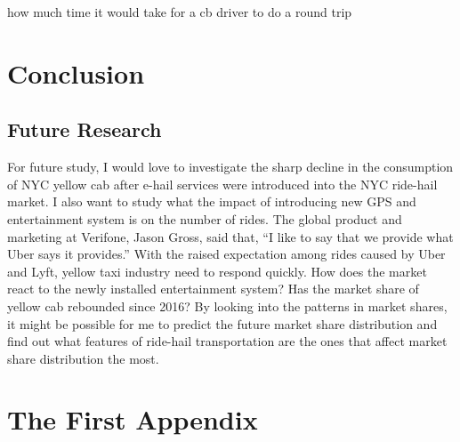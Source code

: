 \documentclass[12pt,twoside]{reedthesis}
\newenvironment{Shaded}{\begin{snugshade}}{\end{snugshade}}
\newcommand{\KeywordTok}[1]{\textcolor[rgb]{0.13,0.29,0.53}{\textbf{#1}}}
\newcommand{\DataTypeTok}[1]{\textcolor[rgb]{0.13,0.29,0.53}{#1}}
\newcommand{\DecValTok}[1]{\textcolor[rgb]{0.00,0.00,0.81}{#1}}
\newcommand{\StringTok}[1]{\textcolor[rgb]{0.31,0.60,0.02}{#1}}
\newcommand{\CommentTok}[1]{\textcolor[rgb]{0.56,0.35,0.01}{\textit{#1}}}
\newcommand{\OperatorTok}[1]{\textcolor[rgb]{0.81,0.36,0.00}{\textbf{#1}}}
\newcommand{\NormalTok}[1]{#1}
\theoremstyle{definition}
\theoremstyle{definition}
\theoremstyle{definition}
\theoremstyle{remark}
\begin{document}
\begin{Shaded}
\end{Shaded}
how much time it would take for a cb driver to do a round trip

\chapter{Conclusion}\label{chapter5}

\section{Future Research}\label{future-research}

For future study, I would love to investigate the sharp decline in the
consumption of NYC yellow cab after e-hail services were introduced into
the NYC ride-hail market. I also want to study what the impact of
introducing new GPS and entertainment system is on the number of rides.
The global product and marketing at Verifone, Jason Gross, said that,
``I like to say that we provide what Uber says it provides.'' With the
raised expectation among rides caused by Uber and Lyft, yellow taxi
industry need to respond quickly. How does the market react to the newly
installed entertainment system? Has the market share of yellow cab
rebounded since 2016? By looking into the patterns in market shares, it
might be possible for me to predict the future market share distribution
and find out what features of ride-hail transportation are the ones that
affect market share distribution the most.

\appendix

\chapter{The First Appendix}\label{the-first-appendix}
\end{document}
